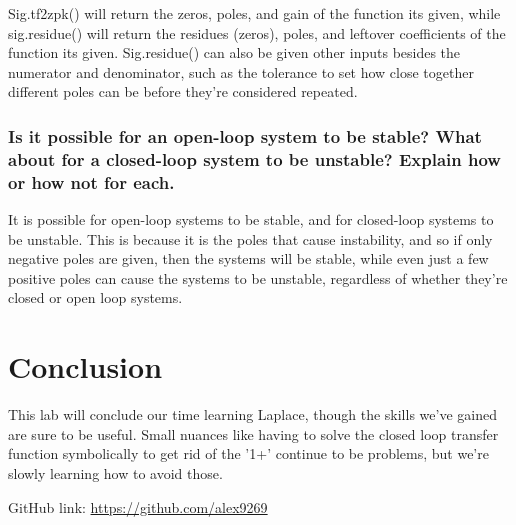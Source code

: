 \documentclass[12pt]{report}
\begin{document}
 Sig.tf2zpk() will return the zeros, poles, and gain of the function its given, while sig.residue() will return the residues (zeros), poles, and leftover coefficients of the function its given. Sig.residue() can also be given other inputs besides the numerator and denominator, such as the tolerance to set how close together different poles can be before they're considered repeated.
 
 \subsubsection{Is it possible for an open-loop system to be stable? What about for a closed-loop system to be unstable? Explain how or how not for each.}
 
 It is possible for open-loop systems to be stable, and for closed-loop systems to be unstable. This is because it is the poles that cause instability, and so if only negative poles are given, then the systems will be stable, while even just a few positive poles can cause the systems to be unstable, regardless of whether they're closed or open loop systems. 
 
 \section{Conclusion}
 
 This lab will conclude our time learning Laplace, though the skills we've gained are sure to be useful. Small nuances like having to solve the closed loop transfer function symbolically to get rid of the '1+' continue to be problems, but we're slowly learning how to avoid those. 
 
 GitHub link: \url{https://github.com/alex9269}
 
\end{document}
